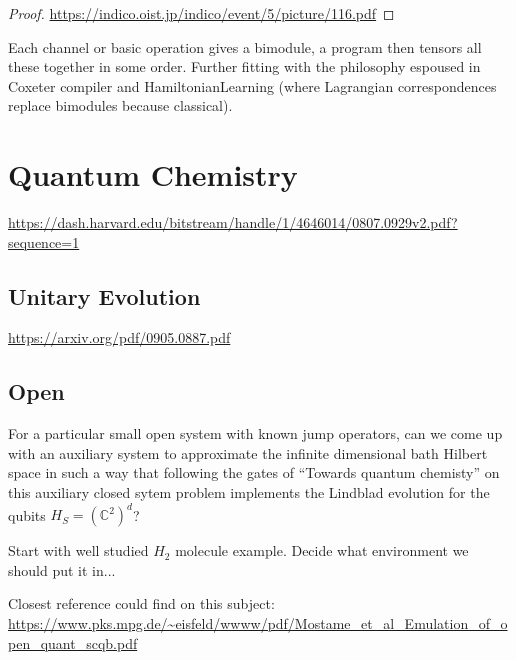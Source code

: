 \documentclass[11pt]{article}
\theoremstyle{change}
\theoremstyle{nonumberplain}
\newtheorem{proof}{Proof}
\numberwithin{equation}{section}
\begin{document}
\begin{proof}
\url{https://indico.oist.jp/indico/event/5/picture/116.pdf}
\end{proof}

Each channel or basic operation gives a bimodule, a program then tensors all these together in some order. Further fitting with the philosophy espoused in Coxeter compiler and HamiltonianLearning (where Lagrangian correspondences replace bimodules because classical).

\section{Quantum Chemistry}

\url{https://dash.harvard.edu/bitstream/handle/1/4646014/0807.0929v2.pdf?sequence=1}

\subsection{Unitary Evolution}

\url{https://arxiv.org/pdf/0905.0887.pdf}

\subsection{Open}

For a particular small open system with known jump operators, can we come up with an auxiliary system to approximate the infinite dimensional bath Hilbert space in such a way that following the gates of ``Towards quantum chemisty'' on this auxiliary closed sytem problem implements the Lindblad evolution for the qubits $H_S = (\mathbb{C}^2)^d$?

Start with well studied $H_2$ molecule example. Decide what environment we should put it in...

Closest reference could find on this subject:
\url{https://www.pks.mpg.de/~eisfeld/wwww/pdf/Mostame_et_al_Emulation_of_open_quant_scqb.pdf}
\end{document}
